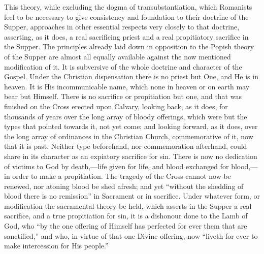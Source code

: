 \documentclass[]{book}
\begin{document}
This theory, while excluding the dogma of transubstantiation, which Romanists feel to be necessary to give consistency and foundation to their doctrine of the Supper, approaches in other essential respects very closely to that doctrine, asserting, as it does, a real sacrificing priest and a real propitiatory sacrifice in the Supper. The principles already laid down in opposition to the Popish theory of the Supper are almost all equally available against the now mentioned modification of it. It is subversive of the whole doctrine and character of the Gospel. Under the Christian dispensation there is no priest but One, and He is in heaven. It is His incommunicable name, which none in heaven or on earth may bear but Himself. There is no sacrifice or propitiation but one, and that was finished on the Cross erected upon Calvary, looking back, as it does, for thousands of years over the long array of bloody offerings, which were but the types that pointed towards it, not yet come; and looking forward, as it does, over the long array of ordinances in the Christian Church, commemorative of it, now that it is past. Neither type beforehand, nor commemoration afterhand, could share in its character as an expiatory sacrifice for sin. There is now no dedication of victims to God by death,---life given for life, and blood exchanged for blood,---in order to make a propitiation. The tragedy of the Cross cannot now be renewed, nor atoning blood be shed afresh; and yet ``without the shedding of blood there is no remission'' in Sacrament or in sacrifice. Under whatever form, or modification the sacramental theory be held, which asserts in the Supper a real sacrifice, and a true propitiation for sin, it is a dishonour done to the Lamb of God, who ``by the one offering of Himself has perfected for ever them that are sanctified,'' and who, in virtue of that one Divine offering, now ``liveth for ever to make intercession for His people.''


\end{document}
